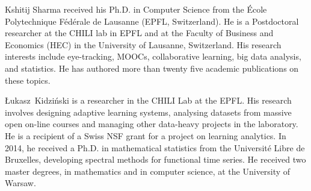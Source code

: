 \documentclass[10pt,journal,compsoc]{IEEEtran}
\begin{document}
\begin{IEEEbiography}{Kshitij Sharma} received his Ph.D. in Computer Science from the École Polytechnique Fédérale de Lausanne (EPFL, Switzerland). He is a Postdoctoral researcher at the CHILI lab in EPFL and at the Faculty of Business and Economics (HEC) in the University of Lausanne, Switzerland. His research interests include eye-tracking, MOOCs, collaborative learning, big data analysis, and statistics. He has authored more than twenty five academic publications on these topics.
\end{IEEEbiography}

\begin{IEEEbiography}{{\L}ukasz~Kidzi\'nski}
 is a researcher in the CHILI Lab at the EPFL. His research involves designing adaptive learning systems, analysing datasets from massive open on-line courses and managing other data-heavy projects in the laboratory. He is a recipient of a Swiss NSF grant for a project on learning analytics. In 2014, he received a Ph.D. in mathematical statistics from the Universit\'e Libre de Bruxelles, developing spectral methods for functional time series. He received two master degrees, in mathematics and in computer science, at the University of Warsaw.
\end{IEEEbiography}
\end{document}
